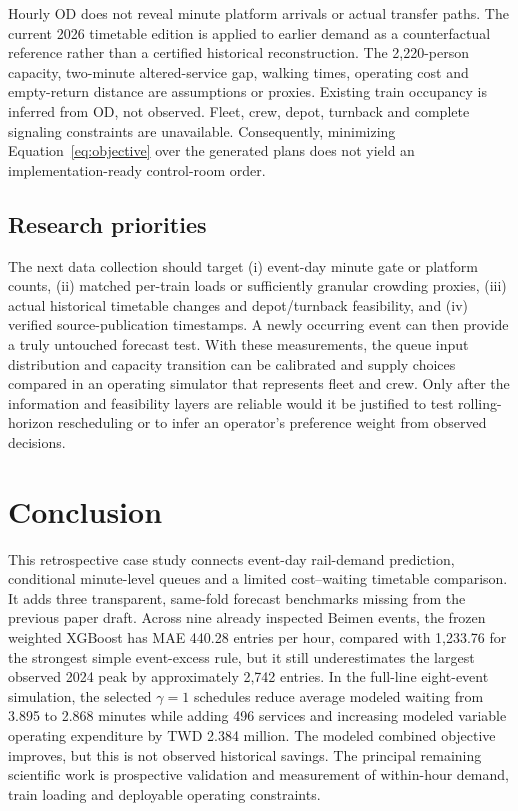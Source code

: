 Hourly OD does not reveal minute platform arrivals or actual transfer paths. The current 2026 timetable edition is applied to earlier demand as a counterfactual reference rather than a certified historical reconstruction. The 2,220-person capacity, two-minute altered-service gap, walking times, operating cost and empty-return distance are assumptions or proxies. Existing train occupancy is inferred from OD, not observed. Fleet, crew, depot, turnback and complete signaling constraints are unavailable. Consequently, minimizing Equation~\eqref{eq:objective} over the generated plans does not yield an implementation-ready control-room order.

\subsection{Research priorities}
The next data collection should target (i) event-day minute gate or platform counts, (ii) matched per-train loads or sufficiently granular crowding proxies, (iii) actual historical timetable changes and depot/turnback feasibility, and (iv) verified source-publication timestamps. A newly occurring event can then provide a truly untouched forecast test. With these measurements, the queue input distribution and capacity transition can be calibrated and supply choices compared in an operating simulator that represents fleet and crew. Only after the information and feasibility layers are reliable would it be justified to test rolling-horizon rescheduling or to infer an operator's preference weight from observed decisions.

\section{Conclusion}
This retrospective case study connects event-day rail-demand prediction, conditional minute-level queues and a limited cost--waiting timetable comparison. It adds three transparent, same-fold forecast benchmarks missing from the previous paper draft. Across nine already inspected Beimen events, the frozen weighted XGBoost has MAE 440.28 entries per hour, compared with 1,233.76 for the strongest simple event-excess rule, but it still underestimates the largest observed 2024 peak by approximately 2,742 entries. In the full-line eight-event simulation, the selected $\gamma=1$ schedules reduce average modeled waiting from 3.895 to 2.868 minutes while adding 496 services and increasing modeled variable operating expenditure by TWD 2.384 million. The modeled combined objective improves, but this is not observed historical savings. The principal remaining scientific work is prospective validation and measurement of within-hour demand, train loading and deployable operating constraints.

